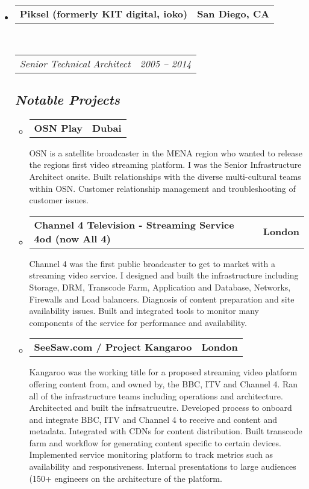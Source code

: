 \documentclass[10pt,a4paper]{article}
\makeatletter
\newcommand{\headerrow}[2]
{\begin{tabular*}{\linewidth}{l@{\extracolsep{\fill}}r}
	#1 &
	#2 \\
\end{tabular*}}
\makeatother
\begin{document}
\begin{itemize}
	\item
	\headerrow
		{\textbf{Piksel (formerly KIT digital, ioko)}}
		{\textbf{San Diego, CA}}
	\\
	\headerrow
		{\emph{Senior Technical Architect}}
		{\emph{2005 -- 2014}}
		\subsection*{\emph{Notable Projects}}
        \begin{itemize}
          \item
          \headerrow
              {\textbf{OSN Play}}
              {\textbf{Dubai}}
              OSN is a satellite broadcaster in the MENA region who wanted to release the regions first video streaming platform. I was the Senior Infrastructure Architect onsite.  Built relationships with the diverse multi-cultural teams within OSN.  Customer relationship management and troubleshooting of customer issues.

					\item
          \headerrow
              {\textbf{Channel 4 Television - Streaming Service 4od (now All 4)}}
              {\textbf{London}}
              Channel 4 was the first public broadcaster to get to market with a streaming video service.  I designed and built the infrastructure including Storage, DRM, Transcode Farm, Application and Database, Networks, Firewalls and Load balancers. Diagnosis of content preparation and site availability issues.  Built and integrated tools to monitor many components of the service for performance and availability.

					\item
          \headerrow
              {\textbf{SeeSaw.com / Project Kangaroo}}
              {\textbf{London}}
              Kangaroo was the working title for a proposed streaming video platform offering content from, and owned by, the BBC, ITV and Channel 4. Ran all of the infrastructure teams including operations and architecture.  Architected and built the infrsatrucutre.  Developed process to onboard and integrate BBC, ITV and Channel 4 to receive and content and metadata. Integrated with CDNs for content distribution. Built transcode farm and workflow for generating content specific to certain devices. Implemented service monitoring platform to track metrics such as availability and responsiveness.  Internal presentations to large audiences (150+ engineers on the architecture of the platform.


\end{itemize}
\end{itemize}
\end{document}
